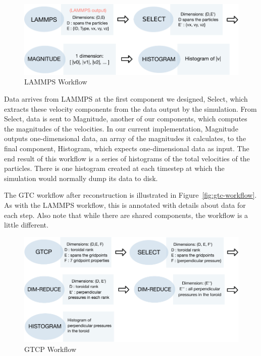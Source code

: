 \documentclass[conference]{IEEEtran}
\begin{document}
\begin{figure}
  \includegraphics[width=\linewidth]{fig/wflow1}
  \caption{LAMMPS Workflow}
  \label{fig:lammps-workflow}
\end{figure}


Data arrives from LAMMPS at the first component we designed, Select, which
extracts these velocity components from the data output by the simulation. From
Select, data is sent to Magnitude, another of our components, which computes
the magnitudes of the velocities. In our current implementation, Magnitude
outputs one-dimensional data, an array of the magnitudes it calculates, to the
final component, Histogram, which expects one-dimensional data as input. The
end result of this workflow is a series of histograms of the total velocities
of the particles. There is one histogram created at each timestep at which the
simulation would normally dump its data to disk.

The GTC workflow after reconstruction is illustrated in
Figure~\ref{fig:gtc-workflow}. As with the LAMMPS workflow, this is annotated
with details about data for each step. Also note that while there are shared
components, the workflow is a little different.

\begin{figure}
  \includegraphics[width=\linewidth]{fig/wflow2}
  \caption{GTCP Workflow}
  \label{fig:gtcp-workflow}
\end{figure}
\end{document}
